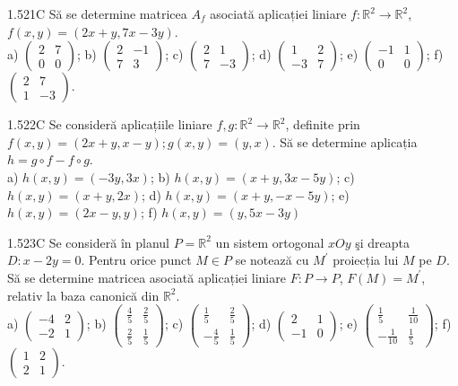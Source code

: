 \documentclass[11pt]{article}
\begin{document}
1.521C Să se determine matricea $A_{f}$ asociată aplicației liniare $f: \mathbb{R}^{2} \rightarrow \mathbb{R}^{2}$, $f(x, y)=(2 x+y, 7 x-3 y)$.\\ a) $\left(\begin{array}{rr}2 & 7 \\ 0 & 0\end{array}\right)$; b) $\left(\begin{array}{rr}2 & -1 \\ 7 & 3\end{array}\right)$; c) $\left(\begin{array}{rr}2 & 1 \\ 7 & -3\end{array}\right)$; d) $\left(\begin{array}{rr}1 & 2 \\ -3 & 7\end{array}\right)$; e) $\left(\begin{array}{rr}-1 & 1 \\ 0 & 0\end{array}\right)$; f) $\left(\begin{array}{rr}2 & 7 \\ 1 & -3\end{array}\right)$.

1.522C Se consideră aplicațiile liniare $f, g: \mathbb{R}^{2} \rightarrow \mathbb{R}^{2}$, definite prin $f(x, y)=(2 x+y, x-y) ; g(x, y)=(y, x)$. Să se determine aplicația $h=g \circ f-f \circ g$.\\ a) $h(x, y)=(-3 y, 3 x)$; b) $h(x, y)=(x+y, 3 x-5 y)$; c) $h(x, y)=(x+y, 2 x)$; d) $h(x, y)=(x+y,-x-5 y)$; e) $h(x, y)=(2 x-y, y)$; f) $h(x, y)=(y, 5 x-3 y)$

1.523C Se consideră în planul $P=\mathbb{R}^{2}$ un sistem ortogonal $x O y$ şi dreapta $D: x-2 y=0$. Pentru orice punct $M \in P$ se notează cu $M^{\prime}$ proiecția lui $M$ pe $D$. Să se determine matricea asociată aplicației liniare $F: P \rightarrow P$, $F(M)=M^{\prime}$, relativ la baza canonică din $\mathbb{R}^{2}$.\\ a) $\left(\begin{array}{rr}-4 & 2 \\ -2 & 1\end{array}\right)$; b) $\left(\begin{array}{rr}\frac{4}{5} & \frac{2}{5} \\ \frac{2}{5} & \frac{1}{5}\end{array}\right)$; c) $\left(\begin{array}{rr}\frac{1}{5} & \frac{2}{5} \\ -\frac{4}{5} & \frac{1}{5}\end{array}\right)$; d) $\left(\begin{array}{rr}2 & 1 \\ -1 & 0\end{array}\right)$; e) $\left(\begin{array}{rr}\frac{1}{5} & \frac{1}{10} \\ -\frac{1}{10} & \frac{1}{5}\end{array}\right)$; f) $\left(\begin{array}{rr}1 & 2 \\ 2 & 1\end{array}\right)$.
\end{document}
